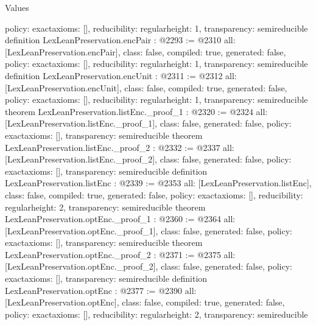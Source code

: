 \begin{lexlean}{Values}
\begin{coremodule}
{  policy: exact{axioms: []},
  reducibility: regular{height: 1},
  transparency: semireducible
}
definition LexLeanPreservation.encPair : @2293 := @2310 {
  all: [LexLeanPreservation.encPair],
  class: false,
  compiled: true,
  generated: false,
  policy: exact{axioms: []},
  reducibility: regular{height: 1},
  transparency: semireducible
}
definition LexLeanPreservation.encUnit : @2311 := @2312 {
  all: [LexLeanPreservation.encUnit],
  class: false,
  compiled: true,
  generated: false,
  policy: exact{axioms: []},
  reducibility: regular{height: 1},
  transparency: semireducible
}
theorem LexLeanPreservation.listEnc._proof_1 : @2320 := @2324 {
  all: [LexLeanPreservation.listEnc._proof_1],
  class: false,
  generated: false,
  policy: exact{axioms: []},
  transparency: semireducible
}
theorem LexLeanPreservation.listEnc._proof_2 : @2332 := @2337 {
  all: [LexLeanPreservation.listEnc._proof_2],
  class: false,
  generated: false,
  policy: exact{axioms: []},
  transparency: semireducible
}
definition LexLeanPreservation.listEnc : @2339 := @2353 {
  all: [LexLeanPreservation.listEnc],
  class: false,
  compiled: true,
  generated: false,
  policy: exact{axioms: []},
  reducibility: regular{height: 2},
  transparency: semireducible
}
theorem LexLeanPreservation.optEnc._proof_1 : @2360 := @2364 {
  all: [LexLeanPreservation.optEnc._proof_1],
  class: false,
  generated: false,
  policy: exact{axioms: []},
  transparency: semireducible
}
theorem LexLeanPreservation.optEnc._proof_2 : @2371 := @2375 {
  all: [LexLeanPreservation.optEnc._proof_2],
  class: false,
  generated: false,
  policy: exact{axioms: []},
  transparency: semireducible
}
definition LexLeanPreservation.optEnc : @2377 := @2390 {
  all: [LexLeanPreservation.optEnc],
  class: false,
  compiled: true,
  generated: false,
  policy: exact{axioms: []},
  reducibility: regular{height: 2},
  transparency: semireducible
}


\end{coremodule}
\end{lexlean}
